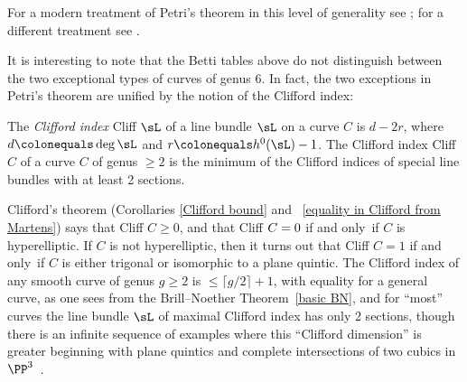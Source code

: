 For a modern treatment of Petri's theorem in this level of generality see
\cite{Schreyer}; for a different treatment see \cite{Arbarello-Sernesi}.

It is interesting to note that the Betti tables above
do not distinguish between the two exceptional types of 
curves of genus 6. In fact, the two exceptions in Petri's theorem are unified  by  the 
notion of the
%
Clifford index:

\begin{definition}
The \emph{Clifford index} Cliff $\sL$ of a line bundle $\sL$ on a curve
%
$C$ is $d-2r$, where $d \colonequals  \deg \sL$ and $r \colonequals
h^0(\sL)-1$. The Clifford index Cliff $C$ of
a curve $C$ of genus $\geq 2$ is the minimum of the Clifford indices
of special line bundles with at least 2 sections.
\unif
\end{definition}

Clifford's theorem (Corollaries \ref{Clifford bound} and ~\ref{equality
in Clifford from Martens}) says that Cliff $C \geq 0$, and that Cliff $C =
\index{Clifford's theorem}%
0$ if and only~if $C$ is hyperelliptic. If $C$ is not hyperelliptic, then
it turns out that Cliff $C=1$ if and only~if $C$ is either trigonal or
isomorphic to a plane quintic. The Clifford index of any smooth curve of
genus $g\geq 2$ is $\leq \lceil g/2\rceil+1$, with equality for a general
curve, as one sees from the Brill--Noether Theorem~\ref{basic BN}, and for
``most'' curves the line bundle $\sL$ of maximal Clifford index has only
2 sections, though there is an infinite sequence of examples where this
``Clifford dimension'' is greater beginning with plane quintics
and complete intersections of two cubics in $\PP^{3}$~\cite{****}.

